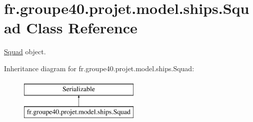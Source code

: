 \hypertarget{classfr_1_1groupe40_1_1projet_1_1model_1_1ships_1_1_squad}{}\section{fr.\+groupe40.\+projet.\+model.\+ships.\+Squad Class Reference}
\label{classfr_1_1groupe40_1_1projet_1_1model_1_1ships_1_1_squad}


\hyperlink{classfr_1_1groupe40_1_1projet_1_1model_1_1ships_1_1_squad}{Squad} object.  


Inheritance diagram for fr.\+groupe40.\+projet.\+model.\+ships.\+Squad\+:\begin{figure}[H]
\begin{center}
\leavevmode
\includegraphics[height=2.000000cm]{classfr_1_1groupe40_1_1projet_1_1model_1_1ships_1_1_squad}
\end{center}
\end{figure}
